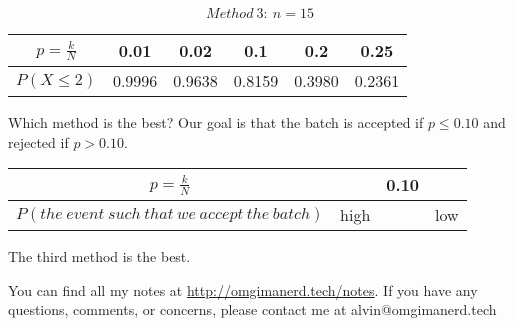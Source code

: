 \documentclass{math}
\begin{document}
\[ Method\ 3:\ n = 15 \]
\begin{center}
  \begin{tabular}{|c|c|c|c|c|c|}
    \hline
    \( p = \frac{k}{N} \) & 0.01 & 0.02 & 0.1 & 0.2 & 0.25 \\
    \hline
    \( P(X\leq 2) \) & 0.9996 & 0.9638 & 0.8159 & 0.3980 & 0.2361 \\
    \hline
  \end{tabular}
\end{center}
Which method is the best? Our goal is that the batch is accepted if
\( p \leq 0.10 \) and rejected if \( p > 0.10 \).
\begin{center}
  \begin{tabular}{|c|c|c|c|}
    \hline
    \( p = \frac{k}{N} \) & & 0.10 & \\
    \hline
    \( P(the\ event\ such\ that\ we\ accept\ the\ batch) \) & high & & low \\
    \hline
  \end{tabular}
\end{center}
The third method is the best.

\begin{center}
  You can find all my notes at \url{http://omgimanerd.tech/notes}. If you have
  any questions, comments, or concerns, please contact me at
  alvin@omgimanerd.tech
\end{center}
\end{document}
